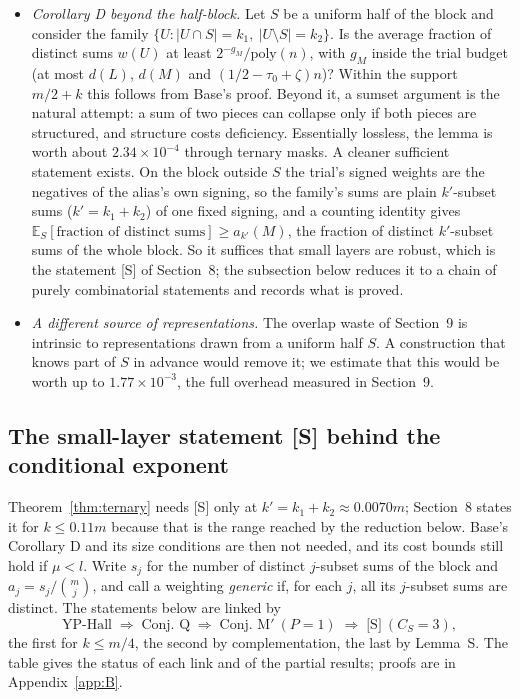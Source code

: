\documentclass[11pt]{article}
\newcommand{\E}{\mathbb{E}}
\newcommand{\poly}{\mathrm{poly}}
\theoremstyle{plain}
\begin{document}
\begin{itemize}
\item \emph{Corollary D beyond the half-block.} Let $S$ be a uniform half of the block and consider the family $\{U : |U \cap S| = k_1,\ |U \setminus S| = k_2\}$. Is the average fraction of distinct sums $w(U)$ at least $2^{-g_M}/\poly(n)$, with $g_M$ inside the trial budget (at most $d(L)$, $d(M)$ and $(1/2 - \tau_0 + \zeta)n$)? Within the support $m/2 + k$ this follows from Base's proof. Beyond it, a sumset argument is the natural attempt: a sum of two pieces can collapse only if both pieces are structured, and structure costs deficiency. Essentially lossless, the lemma is worth about $2.34\times10^{-4}$ through ternary masks. A cleaner sufficient statement exists. On the block outside $S$ the trial's signed weights are the negatives of the alias's own signing, so the family's sums are plain $k'$-subset sums ($k' = k_1 + k_2$) of one fixed signing, and a counting identity gives $\E_S[\text{fraction of distinct sums}] \ge a_{k'}(M)$, the fraction of distinct $k'$-subset sums of the whole block. So it suffices that small layers are robust, which is the statement [S] of Section~8; the subsection below reduces it to a chain of purely combinatorial statements and records what is proved.
\item \emph{A different source of representations.} The overlap waste of Section~9 is intrinsic to representations drawn from a uniform half $S$. A construction that knows part of $S$ in advance would remove it; we estimate that this would be worth up to $1.77\times10^{-3}$, the full overhead measured in Section~9.
\end{itemize}

\subsection*{The small-layer statement [S] behind the conditional exponent}

Theorem~\ref{thm:ternary} needs [S] only at $k' = k_1 + k_2 \approx 0.0070m$; Section~8 states it for $k \le 0.11m$ because that is the range reached by the reduction below. Base's Corollary D and its size conditions are then not needed, and its cost bounds still hold if $\mu < l$. Write $s_j$ for the number of distinct $j$-subset sums of the block and $a_j = s_j/\binom{m}{j}$, and call a weighting \emph{generic} if, for each $j$, all its $j$-subset sums are distinct. The statements below are linked by
\[
\text{YP-Hall} \;\Rightarrow\; \text{Conj.~Q} \;\Rightarrow\; \text{Conj.~M}' \ (P = 1) \;\Rightarrow\; \text{[S]} \ (C_S = 3),
\]
the first for $k \le m/4$, the second by complementation, the last by Lemma~S. The table gives the status of each link and of the partial results; proofs are in Appendix~\ref{app:B}.
\end{document}

